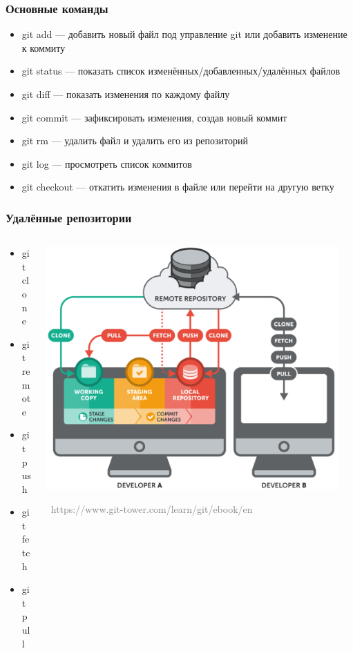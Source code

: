 \documentclass[xetex,mathserif,serif]{beamer}
\newcommand{\attribution}[1] {
\vspace{-5mm}\begin{flushright}\begin{scriptsize}\textcolor{gray}{\textcopyright\, #1}\end{scriptsize}\end{flushright}
}
\begin{document}
	\begin{frame}
		\frametitle{Основные команды}
		\begin{itemize}
			\item git add --- добавить новый файл под управление git или добавить изменение к коммиту
			\item git status --- показать список изменённых/добавленных/удалённых файлов
			\item git diff --- показать изменения по каждому файлу
			\item git commit --- зафиксировать изменения, создав новый коммит
			\item git rm --- удалить файл и удалить его из репозиторий
			\item git log --- просмотреть список коммитов
			\item git checkout --- откатить изменения в файле или перейти на другую ветку
		\end{itemize}
	\end{frame}

	\begin{frame}
		\frametitle{Удалённые репозитории}
		\begin{columns}
			\begin{column}{0.4\textwidth}
				\begin{itemize}
					\item git clone
					\item git remote
					\item git push
					\item git fetch
					\item git pull
				\end{itemize}
			\end{column}
			\begin{column}{0.6\textwidth}
				\begin{center}
					\includegraphics[width=0.95\textwidth]{remoteRepos.png}
					\attribution{https://www.git-tower.com/learn/git/ebook/en}
				\end{center}
			\end{column}
		\end{columns}
	\end{frame}
\end{document}
